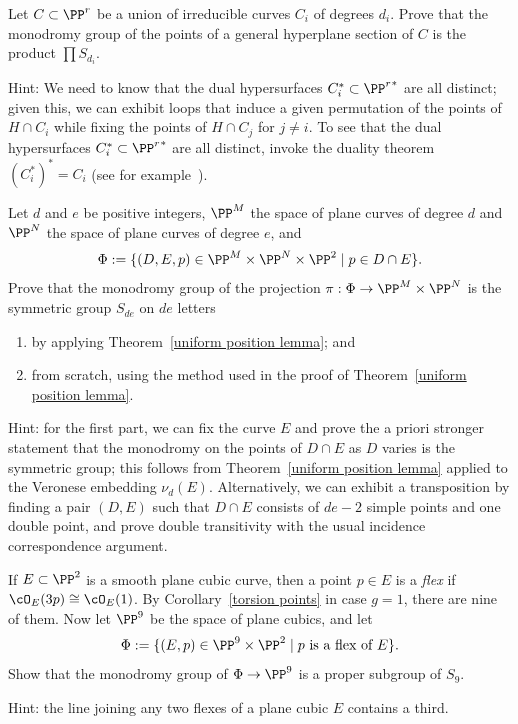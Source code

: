 \begin{exercise}
Let $C \subset \PP^r$ be a union of irreducible curves $C_i$ of degrees $d_i$. Prove that the monodromy group of the points of a general hyperplane section of $C$ is the product $\prod S_{d_i}$.
\end{exercise}

Hint: We need to know that the dual hypersurfaces $C_i^* \subset {\PP^r}^*$ are all distinct; given this, we can exhibit loops that induce a given permutation of the points of $H \cap C_i$ while fixing the points of $H \cap C_j$ for $j \neq i$. To see that the dual hypersurfaces $C_i^* \subset {\PP^r}^*$ are all distinct, invoke the duality theorem $(C_i^*)^* = C_i$ (see for example~\cite{3264}).

\begin{exercise}
Let $d$ and $e$ be positive integers, $\PP^M$ the space of plane curves of degree $d$ and $\PP^N$ the space of plane curves of degree $e$, and
$$
\Phi := \{ (D, E, p) \in \PP^M \times \PP^N \times \PP^2 \mid p \in D \cap E \}.
$$
Prove that the monodromy group of the projection $\pi : \Phi \to \PP^M \times \PP^N$ is the symmetric group $S_{de}$ on $de$ letters
\begin{enumerate}
\item by applying Theorem~\ref{uniform position lemma}; and
\item from scratch, using the method used in the proof of Theorem~\ref{uniform position lemma}.
\end{enumerate}

Hint: for the first part, we can fix the curve $E$ and prove the a priori stronger statement that the monodromy on the points of $D \cap E$ as $D$ varies is the symmetric group; this follows from Theorem~\ref{uniform position lemma} applied to the Veronese embedding $\nu_d(E)$. Alternatively, we can exhibit a transposition by finding a pair $(D,E)$ such that $D \cap E$ consists of $de-2$ simple points and one double point, and prove double transitivity with the usual incidence correspondence argument.
\end{exercise}

\begin{exercise}
If $E \subset \PP^2$ is a smooth plane cubic curve, then a point $p \in E$ is  a \emph{flex} if $\cO_E(3p) \cong \cO_E(1)$. By Corollary~\ref{torsion points} in case $g=1$, there are nine of them. Now let $\PP^9$ be the space of plane cubics, and let
$$
\Phi := \{ (E, p) \in \PP^9 \times \PP^2 \mid p \text{ is a flex of } E \}.
$$
Show that the monodromy group of $\Phi \to \PP^9$ is a proper subgroup of $S_9$. 

Hint: the line joining any two flexes of a plane cubic $E$ contains a third.
\end{exercise}

